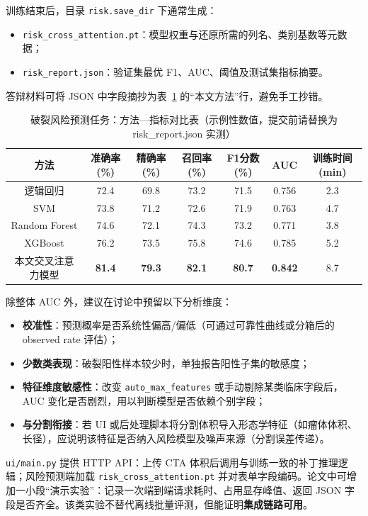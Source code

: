训练结束后，目录 \texttt{risk.save\_dir} 下通常生成：
\begin{itemize}
	\item \texttt{risk\_cross\_attention.pt}：模型权重与还原所需的列名、类别基数等元数据；
	\item \texttt{risk\_report.json}：验证集最优 F1、AUC、阈值及测试集指标摘要。
\end{itemize}
答辩材料可将 JSON 中字段摘抄为表~\ref{tab:risk_result} 的“本文方法”行，避免手工抄错。

\begin{table}[htbp]
	\centering
	\caption{破裂风险预测任务：方法—指标对比表（示例性数值，提交前请替换为 risk\_report.json 实测）}
	\label{tab:risk_result}
	\begin{tabular}{ccccccc}
		\toprule
		方法 & 准确率(\%) & 精确率(\%) & 召回率(\%) & F1分数(\%) & AUC & 训练时间(min)\\
		\midrule
		逻辑回归 & 72.4 & 69.8 & 73.2 & 71.5 & 0.756 & 2.3 \\
		SVM & 73.8 & 71.2 & 72.6 & 71.9 & 0.763 & 4.7 \\
		Random Forest & 74.6 & 72.1 & 74.3 & 73.2 & 0.771 & 3.8 \\
		XGBoost & 76.2 & 73.5 & 75.8 & 74.6 & 0.785 & 5.2 \\
		本文交叉注意力模型 & \textbf{81.4} & \textbf{79.3} & \textbf{82.1} & \textbf{80.7} & \textbf{0.842} & 8.7 \\
		\bottomrule
	\end{tabular}
\end{table}

除整体 AUC 外，建议在讨论中预留以下分析维度：
\begin{itemize}
	\item \textbf{校准性}：预测概率是否系统性偏高/偏低（可通过可靠性曲线或分箱后的 observed rate 评估）；
	\item \textbf{少数类表现}：破裂阳性样本较少时，单独报告阳性子集的敏感度；
	\item \textbf{特征维度敏感性}：改变 \texttt{auto\_max\_features} 或手动剔除某类临床字段后，AUC 变化是否剧烈，用以判断模型是否依赖个别字段；
	\item \textbf{与分割衔接}：若 UI 或后处理脚本将分割体积导入形态学特征（如瘤体体积、长径），应说明该特征是否纳入风险模型及噪声来源（分割误差传递）。
\end{itemize}

\texttt{ui/main.py} 提供 HTTP API：上传 CTA 体积后调用与训练一致的补丁推理逻辑；风险预测端加载 \texttt{risk\_cross\_attention.pt} 并对表单字段编码。论文中可增加一小段“演示实验”：记录一次端到端请求耗时、占用显存峰值、返回 JSON 字段是否齐全。该类实验不替代离线批量评测，但能证明\textbf{集成链路可用}。

